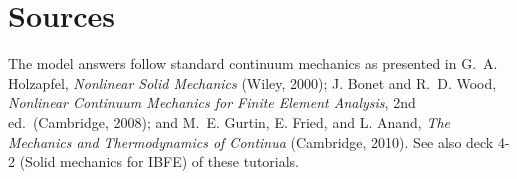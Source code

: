 \documentclass[12pt]{article}
\begin{document}
\section*{Sources}
\small
The model answers follow standard continuum mechanics as presented in
G.~A. Holzapfel, \emph{Nonlinear Solid Mechanics} (Wiley, 2000);
J. Bonet and R.~D. Wood, \emph{Nonlinear Continuum Mechanics for Finite Element Analysis}, 2nd ed.\ (Cambridge, 2008);
and M.~E. Gurtin, E. Fried, and L. Anand, \emph{The Mechanics and Thermodynamics of Continua} (Cambridge, 2010).
See also deck 4-2 (Solid mechanics for IBFE) of these tutorials.
\end{document}
